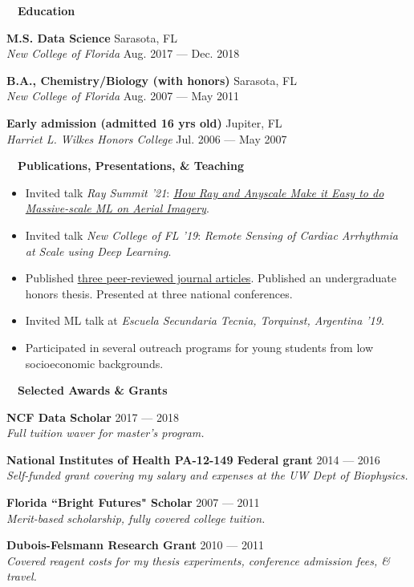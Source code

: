 \documentclass[a4paper,12pt]{article}
\newcommand{\resheading}[1]{{\hspace{-9pt} \colorbox{mygrey}{\begin{minipage}{\textwidth}{\textmd{~~\large \textbf{#1} \vphantom{p\^{E}}}}\end{minipage}}\vspace{6pt}} }
\newcommand{\ressubheading}[4]{{\begin{minipage}{\textwidth}
                                    \textbf{#1} \hfill #2 \\
                                    \textit{#3} \hfill #4 \\
\end{minipage}}}
\begin{document}
    \resheading{Education}

    \ressubheading{M.S. Data Science}{Sarasota, FL}{New College of Florida}{Aug. 2017 --- Dec. 2018}



    \ressubheading{B.A., Chemistry/Biology (with honors)}{Sarasota, FL}{New College of Florida}{Aug. 2007 --- May 2011}

    \ressubheading{Early admission (admitted 16 yrs old)}{Jupiter, FL}{Harriet L. Wilkes Honors College}{Jul. 2006 --- May 2007}

    \resheading{Publications, Presentations, \& Teaching}
    \vspace{-19pt} \begin{itemize}
                       \item Invited talk \textit{Ray Summit '21}: \href{https://www.anyscale.com/events/2021/06/22/how-ray-and-anyscale-make-it-easy-to-do-massive-scale-ml-on-aerial-imagery}{\textit{How Ray and Anyscale Make it Easy to do Massive-scale ML on Aerial Imagery}}.
                       \item Invited talk \textit{New College of FL '19}: \textit{Remote Sensing of Cardiac Arrhythmia at Scale using Deep Learning}.
                       \item Published \href{https://scholar.google.co.nz/citations?user=4ODJ78oAAAAJ&hl=en}{three peer-reviewed journal articles}.
                       Published an undergraduate honors thesis. Presented at three national conferences.
                       \item Invited ML talk at \textit{Escuela Secundaria Tecnia, Torquinst, Argentina '19}.
                       \item Participated in several outreach programs for young students from low socioeconomic backgrounds.
    \end{itemize}


    \resheading{Selected Awards \& Grants}
    \ressubheading{NCF Data Scholar}{2017 --- 2018}{Full tuition waver for master's program.}{}

    \ressubheading{National Institutes of Health PA-12-149 Federal grant}{2014 --- 2016}{Self-funded grant covering my salary and expenses at the UW Dept of Biophysics.}{}


    \ressubheading{Florida ``Bright Futures" Scholar}{2007 --- 2011}{Merit-based scholarship, fully covered college tuition.}{}

    \ressubheading{Dubois-Felsmann Research Grant}{2010 --- 2011}{Covered reagent costs for my thesis experiments, conference admission fees, \& travel.}{}
\end{document}
